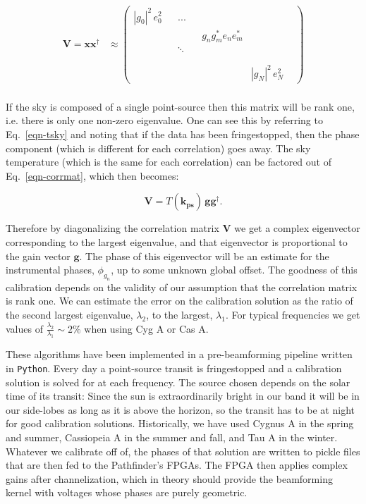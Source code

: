 \begin{align}
\label{eqn-corrmat}
\mathbf{V} = \mathbf{x} \mathbf{x}^\dagger &\approx \begin{pmatrix}
|g_0|^2\, e_0^2 &  & ... & & & \\ 
 &  &  & &  g_n g_m^* e_n e_m^*& \\ 
 &  &  \ddots & & & \\ 
 &  &  &  & & \\
&&&&&&\\
 &  &   &  & &  |g_N|^2 \, e_N^2
\end{pmatrix}
\end{align}
\\

If the sky is composed of a single point-source
then this matrix will be rank one, i.e. there is only one 
non-zero eigenvalue. One can see this by referring to Eq.~\ref{eqn-tsky} 
and noting that if the data has been fringestopped, then the phase 
component (which is different for each correlation) goes away. The 
sky temperature (which is the same for each correlation) 
can be factored out of Eq.~\ref{eqn-corrmat}, which then becomes:

\begin{equation}
\mathbf{V} = T(\mathbf{\hat{k}_{\textrm{ps}}}) \, \mathbf{g} \mathbf{g}^\dagger.
\end{equation}

\noindent Therefore by diagonalizing the correlation matrix $\mathbf{V}$ 
we get a complex eigenvector corresponding to the largest 
eigenvalue, and that eigenvector is proportional to the gain vector $\mathbf{g}$. 
The phase of this eigenvector will be an estimate for the instrumental 
phases, $\phi_{g_n}$, up to some unknown global offset. The goodness 
of this calibration depends on the validity of our assumption 
that the correlation matrix is rank one. We can estimate the 
error on the calibration solution as the ratio of the second largest 
eigenvalue, $\lambda_2$, to the largest, $\lambda_1$. For typical 
frequencies we get values of $\frac{\lambda_2}{\lambda_1}\sim2\%$ 
when using Cyg A or Cas A.

These algorithms have been implemented in a pre-beamforming 
pipeline written in {\tt Python}. Every day a point-source transit 
is fringestopped and a calibration solution is solved for 
at each frequency.
The source chosen depends on the solar time of its transit: Since the
sun is extraordinarily bright in our band it will be in our side-lobes 
as long as it is above the horizon,
so the transit has to be 
at night for good calibration solutions. Historically, 
we have used Cygnus A in the spring and summer, Cassiopeia A 
in the summer and fall, and Tau A in the winter. 
Whatever we calibrate off of, the phases of that solution are 
written to pickle files that are then fed to the Pathfinder's FPGAs.
The FPGA then applies complex gains after channelization, which 
in theory should provide the beamforming kernel with voltages 
whose phases are purely geometric. 

